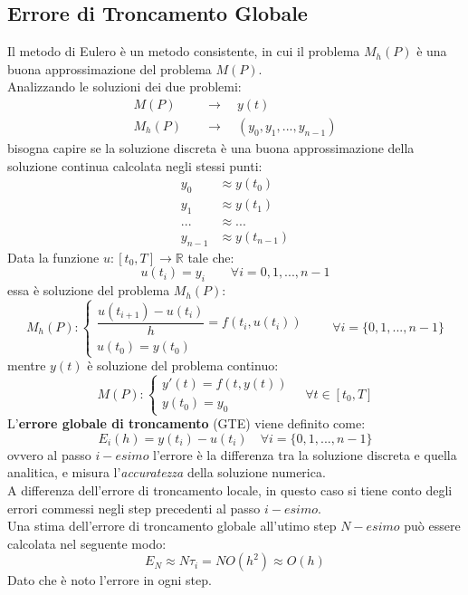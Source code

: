 \subsection{Errore di Troncamento Globale}
Il metodo di Eulero è un metodo consistente, in cui il problema $M_h(P)$ è una buona approssimazione del problema $M(P)$.
\\Analizzando le soluzioni dei due problemi:
\begin{equation*}
	\begin{split}
		M(P) & \quad \rightarrow \quad y(t) \\
		M_h(P) & \quad \rightarrow \quad (y_0, y_1, ..., y_{n-1}) 	
	\end{split}
\end{equation*}
bisogna capire se la soluzione discreta è una buona approssimazione della soluzione continua calcolata negli stessi punti:
\begin{equation*}
	\begin{split}
		y_0 &\approx y(t_0) \\
		y_1 & \approx y(t_1) \\
		... &\approx ... \\
		y_{n-1} &\approx y(t_{n-1})
	\end{split}
\end{equation*}
Data la funzione $u: [t_0, T] \rightarrow \mathbb{R}$ tale che:
\begin{equation}
	u(t_i) = y_i \qquad \forall i = {0,1,...,n-1}
\end{equation}
essa è soluzione del problema $M_h(P)$:
\begin{equation*}
	M_h(P) :
	\begin{cases}
		\dfrac{u(t_{i+1})-u(t_i)}{h} = f(t_i,u(t_i))  \\[0.2cm]
		u(t_{0}) = y(t_0)
	\end{cases}
\qquad \forall i = \{0,1,...,n-1\}
\end{equation*}
mentre $y(t)$ è soluzione del problema continuo:
\begin{equation*}
	M(P) :
	\begin{cases}
		y'(t) = f(t,y(t)) \\[0.2cm]
		y(t_{0}) = y_0
	\end{cases}
\quad \forall t \in [t_0,T]
\end{equation*}
L'\textbf{errore globale di troncamento} (GTE) viene definito come:
\begin{equation}
	E_i(h) = y(t_i) - u(t_i) \quad \forall i = \{0,1,...,n-1\}
\end{equation}
ovvero al passo $i-esimo$ l'errore è la differenza tra la soluzione discreta e quella analitica, e misura l'\textit{accuratezza} della soluzione numerica.
\\A differenza dell'errore di troncamento locale, in questo caso si tiene conto degli errori commessi negli step precedenti al passo $i-esimo$.
\\Una stima dell'errore di troncamento globale all'utimo step $N-esimo$ può essere calcolata nel seguente modo:
\begin{equation}
	\label{GTE}
	E_N \approx N \tau_i = N O(h^2) \approx O(h)
\end{equation}
Dato che è noto l'errore in ogni step.
